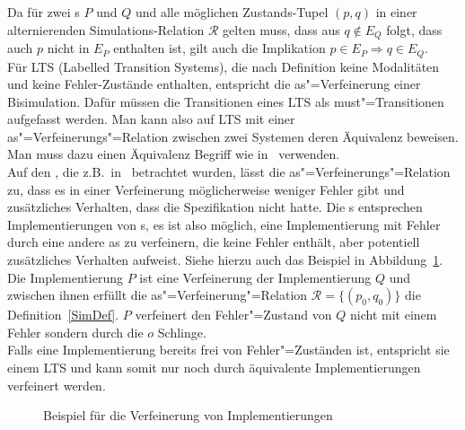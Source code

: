 Da für zwei \MEIO{}s $P$ und $Q$ und alle möglichen Zustands-Tupel $(p,q)$ in
einer alternierenden Simulations-Relation $\mathcal{R}$ gelten muss, dass aus
$q\notin E_Q$ folgt, dass auch $p$ nicht in $E_P$ enthalten ist, gilt auch die
Implikation $p\in E_P\Rightarrow q\in E_Q$.\\
Für LTS (Labelled Transition Systems), die nach Definition keine Modalitäten
und keine Fehler-Zustände enthalten, entspricht die as"=Verfeinerung einer
Bisimulation. Dafür müssen die Transitionen eines LTS als must"=Transitionen
aufgefasst werden. Man kann also auf LTS mit einer as"=Verfeinerungs"=Relation
zwischen zwei Systemen deren Äquivalenz beweisen. Man muss dazu einen
Äquivalenz Begriff wie in~\cite{Milner1989} verwenden.\\
Auf den \EIO{}, die z.B.\ in~\cite{Schinko2016BA} betrachtet wurden, lässt die
as"=Verfeinerungs"=Relation zu, dass es in einer Verfeinerung möglicherweise
weniger Fehler gibt und zusätzliches Verhalten, dass die Spezifikation nicht
hatte. Die \EIO{}s entsprechen Implementierungen von \MEIO{}s, es ist also
möglich, eine Implementierung mit Fehler durch eine andere as zu verfeinern,
die keine Fehler enthält, aber potentiell zusätzliches Verhalten aufweist.
Siehe hierzu auch das Beispiel in Abbildung~\ref{ImplVerfBsp}. Die
Implementierung $P$ ist eine Verfeinerung der Implementierung $Q$ und
zwischen ihnen erfüllt die as"=Verfeinerung"=Relation $\mathcal{R} =
\{(p_0,q_0)\}$ die Definition~\ref{SimDef}. $P$ verfeinert den Fehler"=Zustand
von $Q$ nicht mit einem Fehler sondern durch die $o$ Schlinge.\\
Falls eine Implementierung bereits frei von Fehler"=Zuständen ist, entspricht
sie einem LTS und kann somit nur noch durch äquivalente Implementierungen \glqq
verfeinert\grqq{} werden.

\begin{figure}[htbp]
  \begin{center}
    \caption{Beispiel für die Verfeinerung von Implementierungen}
    \label{ImplVerfBsp}
  \end{center}
\end{figure}

